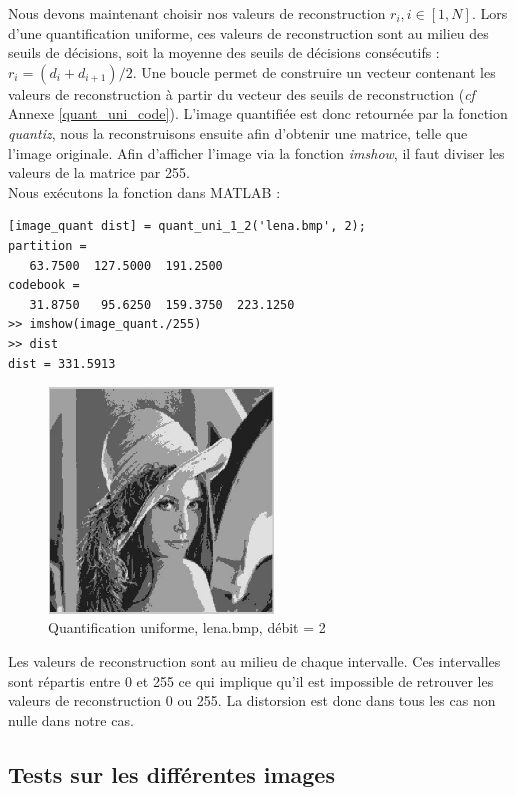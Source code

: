 \documentclass[a4paper, 12pt]{article}
\begin{document}
Nous devons maintenant choisir nos valeurs de reconstruction $r_i, i\in[1, N]$. Lors d'une quantification uniforme, ces valeurs de reconstruction sont au milieu des seuils de décisions, soit la moyenne des seuils de décisions consécutifs : $r_i = (d_i + d_{i+1})/2$. Une boucle permet de construire un vecteur contenant les valeurs de reconstruction à partir du vecteur des seuils de reconstruction (\textit{cf} Annexe \ref{quant_uni_code}). L'image quantifiée est donc retournée par la fonction \textit{quantiz}, nous la reconstruisons ensuite afin d'obtenir une matrice, telle que l'image originale. Afin d'afficher l'image via la fonction \textit{imshow}, il faut diviser les valeurs de la matrice par 255. \\

Nous exécutons la fonction dans MATLAB : 
\begin{verbatim}
[image_quant dist] = quant_uni_1_2('lena.bmp', 2);
partition =
   63.7500  127.5000  191.2500
codebook =
   31.8750   95.6250  159.3750  223.1250
>> imshow(image_quant./255)
>> dist
dist = 331.5913
\end{verbatim}

\begin{figure}[H]
	\centering
		\includegraphics[width=6cm, height=6cm]{../lena_quant_4_niveaux.jpg}
	\caption{Quantification uniforme, lena.bmp, débit = 2}
	\label{fig:lena_quant_4_niveaux}
\end{figure}

Les valeurs de reconstruction sont au milieu de chaque intervalle. Ces intervalles sont répartis entre 0 et 255 ce qui implique qu'il est impossible de retrouver les valeurs de reconstruction 0 ou 255. La distorsion est donc dans tous les cas non nulle dans notre cas. \\

\subsection{Tests sur les différentes images}
\end{document}
